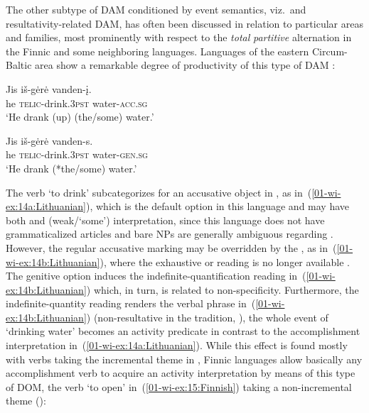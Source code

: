 \documentclass[output=paper]{LSP/langsci}
\begin{document}

The other subtype of DAM conditioned by event semantics, viz.\, and re\-sulta\-ti\-\-vity-related DAM, has often been discussed in relation to particular areas and families, most prominently with respect to the \textit{total} \vs \textit{partitive} alternation in the Finnic and some neighboring  languages. 
Languages of the eastern Circum-Baltic area \citep{Dahletal2001Circum-Baltic} show a remarkable degree of productivity of this type of DAM \citep{Serzant2015Independent}:

\ea\label{01-wi-ex:14:Lithuanian}
\begin{xlist}

\ex\label{01-wi-ex:14a:Lithuanian}
	\gll Jis iš-gėrė	vanden-į.\\
	he \textsc{telic}-drink.\textsc{3pst}	water-\textsc{acc.sg}\\
	\glt ‘He drank (up) (the/some) water.’

\ex\label{01-wi-ex:14b:Lithuanian}
	\gll Jis	iš-gėrė 		vanden-s.\\
	he	\textsc{telic}-drink.\textsc{3pst}	water-\textsc{gen.sg}\\
	\glt ‘He drank (*the/some) water.’
\end{xlist}
\z

\noindent The verb ‘to drink’ subcategorizes for an accusative object in , as in~(\ref{01-wi-ex:14a:Lithuanian}), which is the default option in this language and may have both  and  (weak/‘some’) interpretation, since this language does not have grammaticalized articles and bare NPs are generally ambiguous regarding . 
However, the regular accusative marking may be overridden by the , as in~(\ref{01-wi-ex:14b:Lithuanian}), where the exhaustive or  reading is no longer available \citep{Serzant2014Denotational}. 
The genitive option induces the indefinite-quantification reading in~(\ref{01-wi-ex:14b:Lithuanian}) which, in turn, is related to non-specificity. 
Furthermore, the indefinite-quantity reading renders the verbal phrase in~(\ref{01-wi-ex:14b:Lithuanian})  (non-resultative in the  tradition, \cf \citealt{Huumo2010Nominal}), the whole event of ‘drinking water’ becomes an activity predicate in contrast to the accomplishment interpretation in~(\ref{01-wi-ex:14a:Lithuanian}). 
While this effect is found mostly with verbs taking the incremental theme \citep{Dowty1991Thematic} in  \citep{Serzant2014Denotational}, Finnic languages allow basically any accomplishment verb to acquire an activity interpretation by means of this type of DOM, \cf the verb `to open’ in~(\ref{01-wi-ex:15:Finnish}) taking a non-incremental theme (\cf \citealt{Kiparsky1998Partitive, Huumo2010Nominal}):
\end{document}
